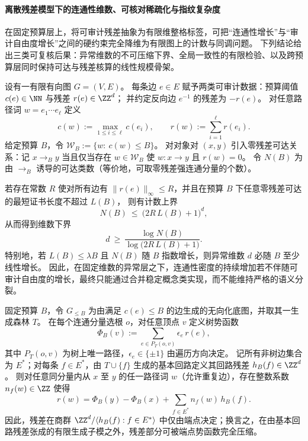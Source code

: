 
\paragraph{离散残差模型下的连通性维数、可核对稀疏化与指纹复杂度}
在固定预算层上，将可审计残差抽象为有限维整格标签，可把“连通性增长”与“审计自由度增长”之间的硬约束完全降维为有限图上的计数与同调问题。
下列结论给出三类可复核后果：异常维数的不可压缩下界、全局一致性的有限检验、以及跨预算层同时保持可达与残差核算的线性规模骨架。

\begin{conclusion}[稳定概念熵与异常维数的不可压缩下界]\label{con:xi-stable-concept-entropy-anom-dimension-lower-bound}
设有一有限有向图 \(G=(V,E)\)。
每条边 \(e\in E\) 赋予两类可审计数据：预算阈值 \(c(e)\in\NN\) 与残差 \(r(e)\in\ZZ^d\)；
并约定反向边 \(e^{-1}\) 的残差为 \(-r(e)\)。
对任意路径词 \(w=e_1\cdots e_\ell\) 定义
\[
c(w):=\max_{1\le i\le \ell} c(e_i),
\qquad
r(w):=\sum_{i=1}^{\ell} r(e_i).
\]
给定预算 \(B\)，令 \(\mathcal{W}_B:=\{w:\ c(w)\le B\}\)。
对对象对 \((x,y)\) 引入零残差可达关系：记 \(x\to_B y\) 当且仅当存在 \(w\in\mathcal{W}_B\) 使 \(w:x\to y\) 且 \(r(w)=0\)。
令 \(N(B)\) 为由 \(\to_B\) 诱导的可达类数（等价地，可取零残差强连通分量的个数）。

若存在常数 \(R\) 使对所有边有 \(\|r(e)\|_\infty\le R\)，并且在预算 \(B\) 下任意零残差可达的最短证书长度不超过 \(L(B)\)，
则有计数上界
\[
N(B)\ \le\ \bigl(2R\,L(B)+1\bigr)^d,
\]
从而得到维数下界
\[
d\ \ge\ \frac{\log N(B)}{\log\bigl(2R\,L(B)+1\bigr)}.
\]
特别地，若 \(L(B)\le \lambda B\) 且 \(N(B)\) 随 \(B\) 指数增长，则异常维数 \(d\) 必随 \(B\) 至少线性增长。
因此，在固定维数的异常层之下，连通性密度的持续增加若不伴随可审计自由度的增长，最终只能通过合并稳定概念类实现，而不能维持严格的语义分裂。
\end{conclusion}

\begin{conclusion}\label{con:xi-tree-potential-cycle-basis-residual-decomposition}
固定预算 \(B\)，令 \(G_{\le B}\) 为由满足 \(c(e)\le B\) 的边生成的无向化底图，并取其一生成森林 \(T\)。
在每个连通分量选根 \(o\)，对任意顶点 \(v\) 定义树势函数
\[
\Phi_B(v):=\sum_{e\in P_T(o,v)} \epsilon_e\, r(e),
\]
其中 \(P_T(o,v)\) 为树上唯一路径，\(\epsilon_e\in\{\pm1\}\) 由遍历方向决定。
记所有非树边集合为 \(E^\ast\)；对每条 \(f\in E^\ast\)，由 \(T\cup\{f\}\) 生成的基本回路定义其回路残差 \(h_B(f)\in\ZZ^d\)。
则对任意同分量内从 \(x\) 至 \(y\) 的任一路径词 \(w\)（允许重复边），存在整数系数 \(n_f(w)\in\ZZ\) 使得
\[
r(w)=\Phi_B(y)-\Phi_B(x)+\sum_{f\in E^\ast} n_f(w)\,h_B(f).
\]
因此，残差在商群
\(
\ZZ^d/\langle h_B(f):f\in E^\ast\rangle
\)
中仅由端点决定；换言之，在由基本回路残差张成的有限生成子模之外，残差部分可被端点势函数完全压缩。
\end{conclusion}

